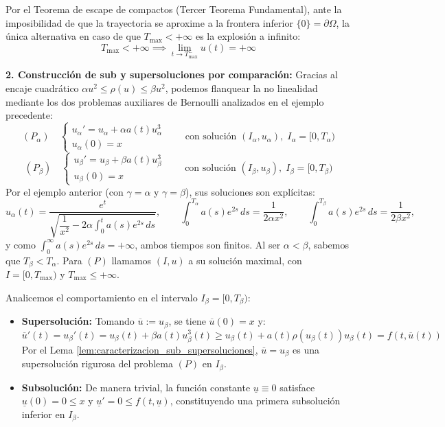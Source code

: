 {    Por el Teorema de escape de compactos (Tercer Teorema Fundamental), ante la imposibilidad de que la trayectoria se aproxime a la frontera inferior $\{0\} = \partial \Omega$, la única alternativa en caso de que $T_{\max} < +\infty$ es la explosión a infinito:
    \[
        T_{\max} < +\infty \implies \lim_{t \to T_{\max}^-} u(t) = +\infty
    \]

    \textbf{2. Construcción de sub y supersoluciones por comparación:}
    Gracias al encaje cuadrático $\alpha u^2 \leq \rho(u) \leq \beta u^2$, podemos flanquear la no linealidad mediante los dos problemas auxiliares de Bernoulli analizados en el ejemplo precedente:
    \[
        (P_\alpha) \quad
        \begin{cases}
            u_\alpha' = u_\alpha + \alpha a(t) u_\alpha^3 \\
            u_\alpha(0) = x
        \end{cases}
        \qquad \text{con solución } (I_\alpha, u_\alpha), \; I_\alpha = [0, T_\alpha)
    \]
    \[
        (P_\beta) \quad
        \begin{cases}
            u_\beta' = u_\beta + \beta a(t) u_\beta^3 \\
            u_\beta(0) = x
        \end{cases}
        \qquad \text{con solución } (I_\beta, u_\beta), \; I_\beta = [0, T_\beta)
    \]
    Por el ejemplo anterior (con $\gamma = \alpha$ y $\gamma = \beta$), sus soluciones son explícitas:
    \[
        u_\alpha(t) = \frac{e^t}{\sqrt{\dfrac{1}{x^2} - 2\alpha \displaystyle\int_0^t a(s) e^{2s} \, ds}}, \qquad
        \int_0^{T_\alpha} a(s) e^{2s} \, ds = \frac{1}{2\alpha x^2}, \qquad
        \int_0^{T_\beta} a(s) e^{2s} \, ds = \frac{1}{2\beta x^2},
    \]
    y como $\int_0^\infty a(s) e^{2s} \, ds = +\infty$, ambos tiempos son finitos. Al ser $\alpha < \beta$, sabemos que $T_\beta < T_\alpha$. Para $(P)$ llamamos $(I, u)$ a su solución maximal, con $I = [0, T_{\max})$ y $T_{\max} \leq +\infty$.
    
    Analicemos el comportamiento en el intervalo $I_\beta = [0, T_\beta)$:
    \begin{itemize}
        \item \textbf{Supersolución:} Tomando $\overline{u} := u_\beta$, se tiene $\overline{u}(0) = x$ y:
        \[
            \overline{u}'(t) = u_\beta'(t) = u_\beta(t) + \beta a(t) u_\beta^3(t) \geq u_\beta(t) + a(t)\rho(u_\beta(t)) u_\beta(t) = f(t, \overline{u}(t))
        \]
        Por el Lema \ref{lem:caracterizacion_sub_supersoluciones}, $\overline{u} = u_\beta$ es una supersolución rigurosa del problema $(P)$ en $I_\beta$.
        \item \textbf{Subsolución:} De manera trivial, la función constante $\underline{u} \equiv 0$ satisface $\underline{u}(0) = 0 \leq x$ y $\underline{u}' = 0 \leq f(t, \underline{u})$, constituyendo una primera subsolución inferior en $I_\beta$.
        

\end{itemize}}
